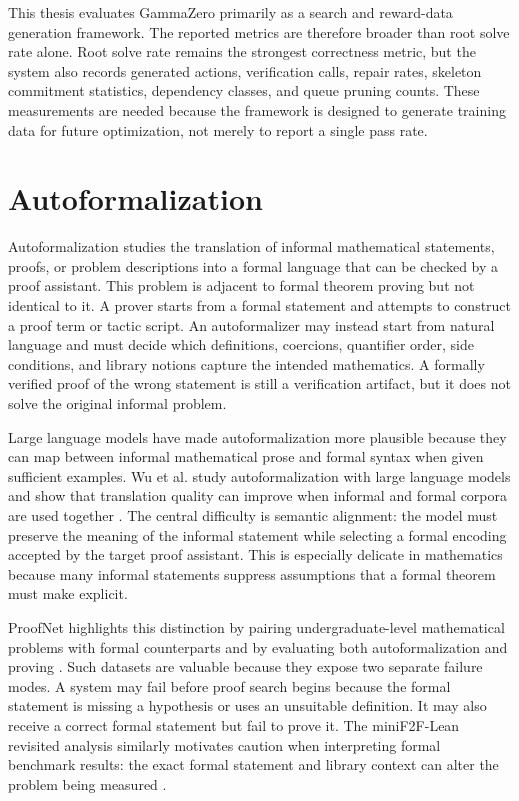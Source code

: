 \documentclass[en]{uet_awesome_thesis/uet-awesome-thesis}
\begin{document}
This thesis evaluates GammaZero primarily as a search and reward-data generation framework. The
reported metrics are therefore broader than root solve rate alone. Root solve rate remains the strongest
correctness metric, but the system also records generated actions, verification calls, repair rates,
skeleton commitment statistics, dependency classes, and queue pruning counts. These measurements are
needed because the framework is designed to generate training data for future optimization, not merely to
report a single pass rate.

\section{Autoformalization}

Autoformalization studies the translation of informal mathematical statements, proofs, or problem
descriptions into a formal language that can be checked by a proof assistant. This problem is adjacent to
formal theorem proving but not identical to it. A prover starts from a formal statement and attempts to
construct a proof term or tactic script. An autoformalizer may instead start from natural language and
must decide which definitions, coercions, quantifier order, side conditions, and library notions capture the
intended mathematics. A formally verified proof of the wrong statement is still a verification artifact, but
it does not solve the original informal problem.

Large language models have made autoformalization more plausible because they can map between
informal mathematical prose and formal syntax when given sufficient examples. Wu et al. study
autoformalization with large language models and show that translation quality can improve when
informal and formal corpora are used together \citep{wu2022autoformalization}. The central difficulty is
semantic alignment: the model must preserve the meaning of the informal statement while selecting a
formal encoding accepted by the target proof assistant. This is especially delicate in mathematics because
many informal statements suppress assumptions that a formal theorem must make explicit.

ProofNet highlights this distinction by pairing undergraduate-level mathematical problems with formal
counterparts and by evaluating both autoformalization and proving \citep{azerbayev2023proofnet}. Such
datasets are valuable because they expose two separate failure modes. A system may fail before proof
search begins because the formal statement is missing a hypothesis or uses an unsuitable definition. It
may also receive a correct formal statement but fail to prove it. The miniF2F-Lean revisited analysis
similarly motivates caution when interpreting formal benchmark results: the exact formal statement and
library context can alter the problem being measured \citep{ospanov2025minif2fLeanRevisited}.
\end{document}
